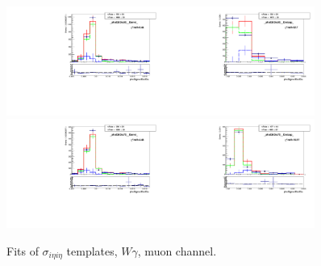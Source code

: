 \begin{figure}[htb]
\begin{center}
   \includegraphics[width=0.45\textwidth]{../figs/figs_v11/MUON_WGamma/TemplateFits/c_TEMPL_SIHIH_UNblind__phoEt55to65__Barrel__RooFit.pdf}\includegraphics[width=0.45\textwidth]{../figs/figs_v11/MUON_WGamma/TemplateFits/c_TEMPL_SIHIH_UNblind__phoEt55to65__Endcap__RooFit.pdf}\\
   \includegraphics[width=0.45\textwidth]{../figs/figs_v11/MUON_WGamma/TemplateFits/c_TEMPL_SIHIH_UNblind__phoEt65to75__Barrel__RooFit.pdf}\includegraphics[width=0.45\textwidth]{../figs/figs_v11/MUON_WGamma/TemplateFits/c_TEMPL_SIHIH_UNblind__phoEt65to75__Endcap__RooFit.pdf}\\
  \label{fig:templateFits_SIHIH_MUON_2}
  \caption{Fits of $\sigma_{i \eta i \eta}$ templates, $W\gamma$, muon channel.}
  \end{center}
\end{figure}

